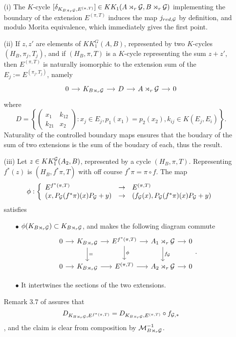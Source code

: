 \begin{dem}
\begin{enumerate}

\item[(i)]The $K$-cycle $[\delta_{K_{B\rtimes_r \mathcal G},E^{(\pi,T)}}]\in KK_1(A\rtimes_r \mathcal G, B\rtimes_r \mathcal G)$ implementing the boundary of the extension $E^{(\pi,T)}$ induces the map $j_{red,\mathcal G}$ by definition, and modulo Morita equivalence, which immediately gives the first point.

\item[(ii)] If $z,z'$ are elements of $KK_1^G(A,B)$, represented by two $K$-cycles $(H_B,\pi_j,T_j)$, and if $(H_B,\pi,T)$ is a $K$-cycle representing the sum $z+z'$, then $E^{(\pi,T)}$ is naturally isomorphic to the extension sum of the $E_j:=E^{(\pi_j,T_j)}$, namely
\[\begin{tikzcd}[column sep = small]
0\arrow{r} & K_{B\rtimes_r \G} \arrow{r} & D \arrow{r} & A\rtimes_r \G \arrow{r} & 0
\end{tikzcd}\]
where 
\[D=\left\{\begin{pmatrix}x_1 & k_{12}\\ k_{21} & x_2\end{pmatrix} : x_j\in E_j , p_1(x_1)=p_2(x_2), k_{ij}\in K(E_j,E_i)\right\}.\]
Naturality of the controlled boundary maps \cite{OY2} ensures that the boudary of the sum of two extensions is the sum of the boudary of each, thus the result.
\item[(iii)] Let $z\in KK_1^\mathcal G(A_2,B)$, represented by a cycle $(H_B,\pi,T)$. Representing $f^*(z)$ is $(H_B,f^*\pi,T)$ with off course $f^*\pi=\pi \circ f$. The map 
\[\phi : \left\{\begin{array}{lll} E^{f^*(\pi,T)} & \rightarrow & E^{(\pi,T)} \\
( x, P_\mathcal G(f^*\pi)(x)P_\mathcal G+y) & \rightarrow & ( f_\mathcal G(x), P_\mathcal G(f^*\pi)(x)P_\mathcal G+y) \end{array}\right. \]
satisfies
\begin{enumerate}
\item[$\bullet$] $\phi(K_{B\rtimes_r \mathcal G})\subset K_{B\rtimes_r \mathcal G}$, and makes the following diagram commute
\[\begin{tikzcd}[column sep = small]
0\arrow{r} & K_{B\rtimes_r \G}\arrow{r}\arrow{d}{=} & E^{f^*(\pi,T)} \arrow{r}\arrow{d}{\phi}& A_1\rtimes_r \G\arrow{r}\arrow{d}{f_\G} & 0\\
0\arrow{r} & K_{B\rtimes_r \G}\arrow{r} & E^{(\pi,T)} \arrow{r}& A_2\rtimes_r \G\arrow{r} & 0
\end{tikzcd}.\]
\item[$\bullet$] It intertwines the sections of the two extensions.
\end{enumerate}
Remark $3.7$ of \cite{OY2} assures that \[D_{K_{B\rtimes_r \mathcal G}, E^{f^*(\pi,T)} } =  D_{K_{B\rtimes_r \mathcal G}, E^{(\pi,T)} }\circ f_{\mathcal G,*}\], and the claim is clear from composition by $\mathcal M_{B\rtimes_r \mathcal G}^{-1}$.


\end{enumerate}
\end{dem}
